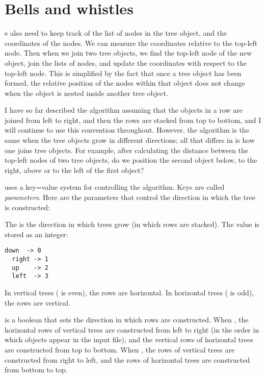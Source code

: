 \documentclass[11pt,english,BCOR10mm,DIV12,bibliography=totoc,parskip=false,smallheadings
    headexclude,footexclude,oneside]{pst-doc}
\begin{document}
\section{Bells and whistles\label{bells}}

e also need to keep track of the list of nodes in the tree object, and the coordinates of the nodes. 
We can measure the coordinates relative to the top-left node. Then when we join two tree objects, 
we find the top-left node of the new object, join the lists of nodes, and update the coordinates 
with respect to the top-left node. This is simplified by the fact that once a tree object has been 
formed, the relative position of the nodes within that object does not change when the object is 
nested inside another tree object.

I have so far described the algorithm assuming that the objects in a row are joined from left to 
right, and then the rows are stacked from top to bottom, and I will continue to use this convention 
throughout. However, the algorithm is the same when the tree objects grow in different directions; 
all that differs in  is how one joins tree objects. For example, after calculating the 
distance between the top-left nodes of two tree objects, do we position the second object below, 
to the right, above or to the left of the first object?

 uses a key=value system for controlling the algorithm. Keys are called {\em parameters}. 
Here are the parameters that control the direction in which the tree is constructed:
\begin{compactdesc}%
  \item[\Lkeyword{treemode}] The  is the direction in which trees grow (in which rows are stacked). 
  The value is stored as an integer:
\begin{lstlisting}[style=syntax]
  down  -> 0
  right -> 1
  up    -> 2
  left  -> 3
\end{lstlisting}
In vertical trees ( is even), the rows are horizontal. In horizontal trees 
( is odd), the rows are vertical.
  \item[\Lkeyword{treeflip}]  is a boolean that sets the direction in which rows are 
  constructed. When \false, the horizontal rows of vertical trees are constructed from left to right 
  (in the order in which objects appear in the input file), and the vertical rows of horizontal trees 
  are constructed from top to bottom. When \true, the rows of vertical trees are constructed from
   right to left, and the rows of horizontal trees are constructed from bottom to top.
\end{compactdesc}
\end{document}
